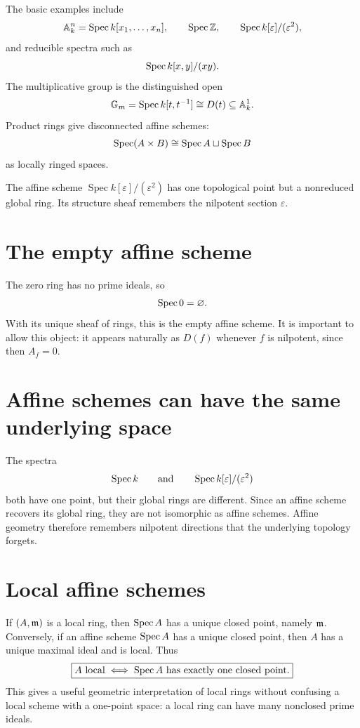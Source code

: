 The basic examples include
\[
\mathbb A^n_k=\operatorname{Spec} k[x_1,\dots,x_n],
\qquad
\operatorname{Spec}\mathbb Z,
\qquad
\operatorname{Spec} k[\varepsilon]/(\varepsilon^2),
\]
and reducible spectra such as
\[
\operatorname{Spec} k[x,y]/(xy).
\]
The multiplicative group is the distinguished open
\[
\mathbb G_m=\operatorname{Spec} k[t,t^{-1}]\cong D(t)\subseteq\mathbb A^1_k.
\]
Product rings give disconnected affine schemes:
\[
\operatorname{Spec}(A\times B)\cong \operatorname{Spec} A\sqcup\operatorname{Spec} B
\]
as locally ringed spaces.



\begin{example}\label{ex:vi18-expand-02}
The affine scheme $\operatorname{Spec}k[\varepsilon]/(\varepsilon^2)$ has one topological point but a nonreduced global ring.  Its structure sheaf remembers the nilpotent section $\varepsilon$.
\end{example}
\section{The empty affine scheme}

The zero ring has no prime ideals, so
\[
\operatorname{Spec} 0=\varnothing.
\]
With its unique sheaf of rings, this is the empty affine scheme.  It is important to allow
this object: it appears naturally as $D(f)$ whenever $f$ is nilpotent, since then $A_f=0$.

\section{Affine schemes can have the same underlying space}

The spectra
\[
\operatorname{Spec} k
\qquad\text{and}\qquad
\operatorname{Spec} k[\varepsilon]/(\varepsilon^2)
\]
both have one point, but their global rings are different.  Since an affine scheme recovers
its global ring, they are not isomorphic as affine schemes.  Affine geometry therefore
remembers nilpotent directions that the underlying topology forgets.

\section{Local affine schemes}

If $(A,\mathfrak m)$ is a local ring, then $\operatorname{Spec} A$ has a unique closed point, namely $\mathfrak m$.
Conversely, if an affine scheme $\operatorname{Spec} A$ has a unique closed point, then $A$ has a unique
maximal ideal and is local.  Thus
\[
\boxed{
A\text{ local}\iff\operatorname{Spec} A\text{ has exactly one closed point}.}
\]
This gives a useful geometric interpretation of local rings without confusing a local scheme
with a one-point space: a local ring can have many nonclosed prime ideals.

